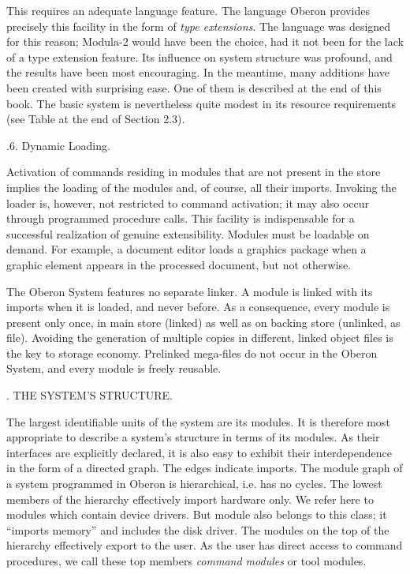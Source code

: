 This requires an adequate language feature. The language Oberon
provides precisely this facility in the form of \emph{type extensions}. The
language was designed for this reason; Modula-2 would have been the
choice, had it not been for the lack of a type extension feature. Its
influence on system structure was profound, and the results have been
most encouraging. In the meantime, many additions have been created
with surprising ease. One of them is described at the end of this
book. The basic system is nevertheless quite modest in its resource
requirements (see Table at the end of Section 2.3).

.6. Dynamic Loading.

Activation of commands residing in modules that are not present in the
store implies the loading of the modules and, of course, all their
imports. Invoking the loader is, however, not restricted to command
activation; it may also occur through programmed procedure calls. This
facility is indispensable for a successful realization of genuine
extensibility. Modules must be loadable on demand. For example, a
document editor loads a graphics package when a graphic element
appears in the processed document, but not otherwise.

The Oberon System features no separate linker. A module is linked with
its imports when it is loaded, and never before. As a consequence,
every module is present only once, in main store (linked) as well as
on backing store (unlinked, as file). Avoiding the generation of
multiple copies in different, linked object files is the key to
storage economy. Prelinked mega-files do not occur in the Oberon
System, and every module is freely reusable.


. THE SYSTEM'S STRUCTURE.


The largest identifiable units of the system are its modules. It is
therefore most appropriate to describe a system's structure in terms
of its modules. As their interfaces are explicitly declared, it is
also easy to exhibit their interdependence in the form of a directed
graph. The edges indicate imports. The module graph of a system
programmed in Oberon is hierarchical, i.e. has no cycles. The lowest
members of the hierarchy effectively import hardware only. We refer
here to modules which contain device drivers. But module  also
belongs to this class; it ``imports memory'' and includes the disk
driver. The modules on the top of the hierarchy effectively export to
the user. As the user has direct access to command procedures, we call
these top members \emph{command modules} or tool modules.

